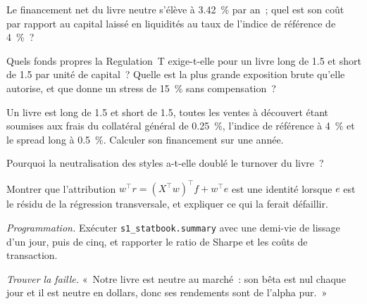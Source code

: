 \begin{exercise}[$\star$]\label{exo:s1:anatomy-of-a-stat-arb-book:2}
Le financement net du livre neutre s'élève à 3.42~\% par an~; quel est son coût par rapport au capital laissé en liquidités au taux de l'indice de référence de 4~\%~?
\end{exercise}

\begin{exercise}[$\star$]\label{exo:s1:anatomy-of-a-stat-arb-book:3}
Quels fonds propres la Regulation~T exige-t-elle pour un livre long de 1.5 et short de 1.5 par unité de capital~? Quelle est la plus grande exposition brute qu'elle autorise, et que donne un stress de 15~\%
sans compensation~?
\end{exercise}

\begin{exercise}[$\star\star$]\label{exo:s1:anatomy-of-a-stat-arb-book:4}
Un livre est long de 1.5 et short de 1.5, toutes les ventes à découvert étant soumises aux frais du collatéral général de 0.25~\%, l'indice de référence à 4~\% et le spread long à 0.5~\%. Calculer son financement sur
une année.
\end{exercise}

\begin{exercise}[$\star\star$]\label{exo:s1:anatomy-of-a-stat-arb-book:5}
Pourquoi la neutralisation des styles a-t-elle doublé le turnover du livre~?
\end{exercise}

\begin{exercise}[$\star\star$]\label{exo:s1:anatomy-of-a-stat-arb-book:6}
Montrer que l'attribution $w^\top r = (X^\top w)^\top f + w^\top e$ est une identité lorsque $e$ est le résidu de la régression transversale, et expliquer ce qui la
ferait défaillir.
\end{exercise}

\begin{exercise}[$\star\star\star$]\label{exo:s1:anatomy-of-a-stat-arb-book:7}
\emph{Programmation.} Exécuter \texttt{s1\_statbook.summary} avec une demi-vie de lissage d'un jour, puis de cinq, et rapporter le ratio de Sharpe et les coûts de transaction.
\end{exercise}

\begin{exercise}[$\star\star\star$]\label{exo:s1:anatomy-of-a-stat-arb-book:8}
\emph{Trouver la faille.} «~Notre livre est neutre au marché~: son bêta est nul chaque jour et il est neutre en dollars, donc ses rendements sont de l'alpha pur.~»
\end{exercise}


